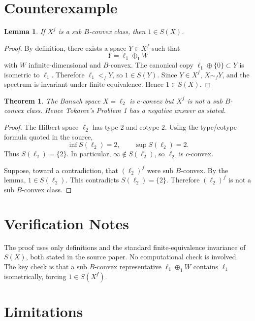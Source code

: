\documentclass[11pt]{article}
\newtheorem{theorem}{Theorem}
\newtheorem{lemma}{Lemma}
\begin{document}
\section*{Counterexample}

\begin{lemma}
If \(X^f\) is a sub \(B\)-convex class, then \(1\in S(X)\).
\end{lemma}

\begin{proof}
By definition, there exists a space \(Y\in X^f\) such that
\[
Y=\ell_1\oplus_1 W
\]
with \(W\) infinite-dimensional and \(B\)-convex. The canonical copy
\(\ell_1\oplus\{0\}\subset Y\) is isometric to \(\ell_1\). Therefore
\(\ell_1<_f Y\), so \(1\in S(Y)\). Since \(Y\in X^f\), \(X\sim_f Y\), and the
spectrum is invariant under finite equivalence. Hence \(1\in S(X)\).
\end{proof}

\begin{theorem}
The Banach space \(X=\ell_2\) is \(c\)-convex but \(X^f\) is not a sub
\(B\)-convex class. Hence Tokarev's Problem 1 has a negative answer as stated.
\end{theorem}

\begin{proof}
The Hilbert space \(\ell_2\) has type \(2\) and cotype \(2\). Using the
type/cotype formula quoted in the source,
\[
\inf S(\ell_2)=2,\qquad \sup S(\ell_2)=2.
\]
Thus \(S(\ell_2)=\{2\}\). In particular, \(\infty\notin S(\ell_2)\), so
\(\ell_2\) is \(c\)-convex.

Suppose, toward a contradiction, that \((\ell_2)^f\) were sub \(B\)-convex.
By the lemma, \(1\in S(\ell_2)\). This contradicts \(S(\ell_2)=\{2\}\).
Therefore \((\ell_2)^f\) is not a sub \(B\)-convex class.
\end{proof}

\section*{Verification Notes}

The proof uses only definitions and the standard finite-equivalence invariance
of \(S(X)\), both stated in the source paper. No computational check is
involved. The key check is that a sub \(B\)-convex representative
\(\ell_1\oplus_1 W\) contains \(\ell_1\) isometrically, forcing
\(1\in S(X^f)\).

\section*{Limitations}
\end{document}

